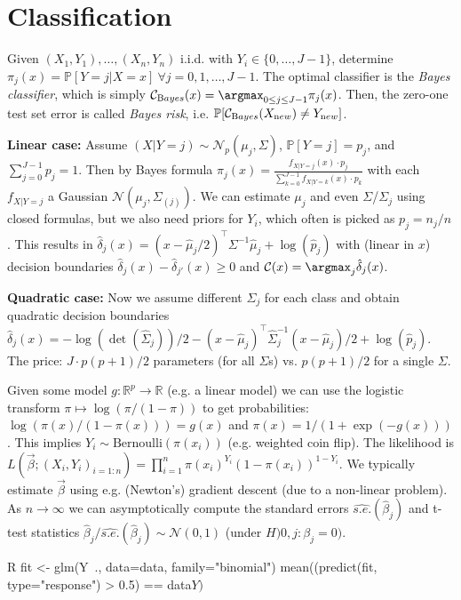 \section{Classification}\label{sec:classification}
Given $(X_1, Y_1), \dots, (X_n,Y_n)$ i.i.d. with $Y_i \in \{0, \dots, J-1\}$, determine $\pi_j(x) = \mathbb{P}[Y=j|X=x]\ \forall j = 0,1,\dots,J-1$.
The optimal classifier is the \emph{Bayes classifier}, which is simply $\mathcal{C}_{\textrm Bayes}(x) = \argmax_{0\leq j\leq J-1}\pi_j(x)$.
Then, the zero-one test set error is called \emph{Bayes risk}, i.e. $\mathbb{P}[\mathcal{C}_{\textrm Bayes}(X_{\textrm new}) \neq Y_{\textrm new}]$.

\begin{sectionbox}\nospacing{}
  \textbf{Linear case: }Assume $(X | Y=j) \sim \mathcal{N}_p(\mu_j, \Sigma)$, $\mathbb{P}[Y=j] = p_j$, and $\sum_{j=0}^{J-1}p_j=1$.
  Then by Bayes formula $\pi_j(x) = \frac{f_{X|Y=j}(x)\cdot p_j}{\sum_{k=0}^{J-1}f_{X|Y=k}(x)\cdot p_k}$ with each $f_{X|Y=j}$ a Gaussian $\mathcal{N}(\mu_j, \Sigma_{(j)})$.
  We can estimate $\mu_j$ and even $\Sigma$/$\Sigma_j$ using closed formulas, but we also need priors for $Y_i$, which often is picked as $p_j=n_j/n$.
  This results in $\hat \delta_j(x) = (x-\hat{\mu}_j/2)^{\top}\Sigma^{-1}\hat{\mu}_j+\log(\hat p_j)$ with (linear in $x$) decision boundaries $\hat{\delta}_j(x) - \hat \delta_{j'}(x) \geq 0$ and $\mathcal{C}(x) = \argmax_j \hat \delta_j(x)$.

  \textbf{Quadratic case: } Now we assume different $\Sigma_j$ for each class and obtain quadratic decision boundaries $\hat{\delta}_j(x) = -\log(\det(\hat\Sigma_j))/2 - (x-\hat{\mu}_j)^{\top}\hat{\Sigma}_j^{-1}(x-\hat{\mu}_j)/2 + \log(\hat p_j)$.
  The price: $J\cdot p(p+1)/2$ parameters (for all $\Sigma$s) vs. $p(p+1)/2$ for a single $\Sigma$.
\end{sectionbox}

\begin{sectionbox}\nospacing{}
  Given some model $g: \mathbb{R}^p \to \mathbb{R}$ (e.g. a linear model) we can use the logistic transform $\pi \mapsto \log(\pi/(1-\pi))$ to get probabilities: $\log(\pi(x)/(1-\pi(x))) = g(x)$ and $\pi(x) = 1/(1+\exp{(-g(x))})$.
  This implies $Y_i \sim \text{Bernoulli}(\pi(x_i))$ (e.g. weighted coin flip). The likelihood is $L(\vec{\beta}; (X_i,Y_i)_{i=1:n}) = \prod_{i=1}^n\pi(x_i)^{Y_i}(1-\pi(x_i))^{1-Y_i}$.
  We typically estimate $\vec{\beta}$ using e.g. (Newton's) gradient descent (due to a non-linear problem).
  As $n\to \infty$ we can asymptotically compute the standard errors $\widehat{s.e.}(\hat{\beta}_j)$ and t-test statistics $\hat\beta_j/\widehat{s.e.}(\hat\beta_j) \sim \mathcal{N}(0,1)$ (under $H){0,j}: \beta_j=0)$.
  \begin{mintlinebox}{R}
    fit <- glm(Y~., data=data, family="binomial")
    mean((predict(fit, type="response") > 0.5) == data$Y)$
  \end{mintlinebox}
\end{sectionbox}

